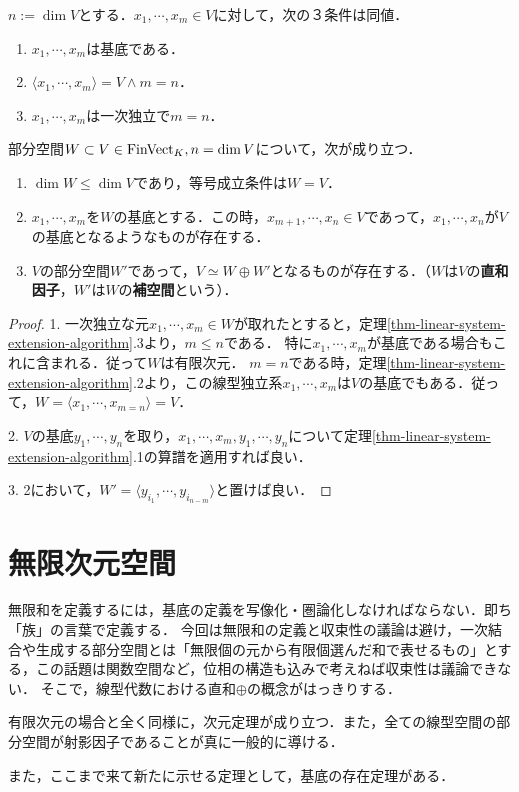 \documentclass[uplatex, 12pt, dvipdfmx]{jsreport}
\begin{document}
\begin{corollary}
    $n:=\dim V$とする．$x_1,\cdots,x_m\in V$に対して，次の３条件は同値．
    \begin{enumerate}
        \item $x_1,\cdots,x_m$は基底である．
        \item $\langle x_1,\cdots,x_m\rangle =V\land m=n$．
        \item $x_1,\cdots,x_m$は一次独立で$m=n$．
    \end{enumerate}
\end{corollary}

\begin{proposition}
    部分空間$W\subset V\in\mathrm{FinVect}_K, n=\dim  V$について，次が成り立つ．
    \begin{enumerate}
        \item $\dim W\le\dim V$であり，等号成立条件は$W=V$．
        \item $x_1,\cdots,x_m$を$W$の基底とする．この時，$x_{m+1},\cdots,x_n\in V$であって，$x_1,\cdots,x_n$が$V$の基底となるようなものが存在する．
        \item $V$の部分空間$W'$であって，$V\simeq W\oplus W'$となるものが存在する．（$W$は$V$の\textbf{直和因子}，$W'$は$W$の\textbf{補空間}という）．
    \end{enumerate}
\end{proposition}
\begin{proof}
    1. 一次独立な元$x_1,\cdots,x_m\in W$が取れたとすると，定理\ref{thm-linear-system-extension-algorithm}.3より，$m\le n$である．
    特に$x_1,\cdots,x_m$が基底である場合もこれに含まれる．従って$W$は有限次元．
    $m=n$である時，定理\ref{thm-linear-system-extension-algorithm}.2より，この線型独立系$x_1,\cdots,x_m$は$V$の基底でもある．従って，$W=\langle x_1,\cdots,x_{m=n}\rangle=V$．

    2. $V$の基底$y_1,\cdots,y_n$を取り，$x_1,\cdots,x_m,y_1,\cdots,y_n$について定理\ref{thm-linear-system-extension-algorithm}.1の算譜を適用すれば良い．

    3. 2において，$W'=\langle y_{i_1},\cdots,y_{i_{n-m}}\rangle$と置けば良い．
\end{proof}

\section{無限次元空間}

\begin{screen}
    無限和を定義するには，基底の定義を写像化・圏論化しなければならない．即ち「族」の言葉で定義する．
    今回は無限和の定義と収束性の議論は避け，一次結合や生成する部分空間とは「無限個の元から有限個選んだ和で表せるもの」とする，この話題は関数空間など，位相の構造も込みで考えねば収束性は議論できない．
    そこで，線型代数における直和$\oplus$の概念がはっきりする．

    有限次元の場合と全く同様に，次元定理が成り立つ．また，全ての線型空間の部分空間が射影因子であることが真に一般的に導ける．

    また，ここまで来て新たに示せる定理として，基底の存在定理がある．
\end{screen}
\end{document}

